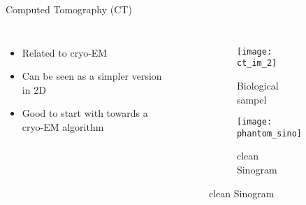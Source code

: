 

\begin{frame}[c]{Computed Tomography (CT)}
    \begin{columns}[c]
            \begin{itemize}
                \item Related to cryo-EM
                \item Can be seen as a simpler version in 2D
                \item Good to start with towards a cryo-EM algorithm
            \end{itemize}
        
        \begin{figure}
            \centering
            \begin{subfigure}[t]{0.45\textwidth}
                \texttt{[image: ct\_im\_2]}
                \caption{Biological sampel}
            \end{subfigure}\hfill                
            \begin{subfigure}[t]{0.51\textwidth}
                \texttt{[image: phantom\_sino]}
                \caption{clean Sinogram}
            \end{subfigure}\hfill          
        \end{figure}

        
    \end{columns}

\end{frame}

